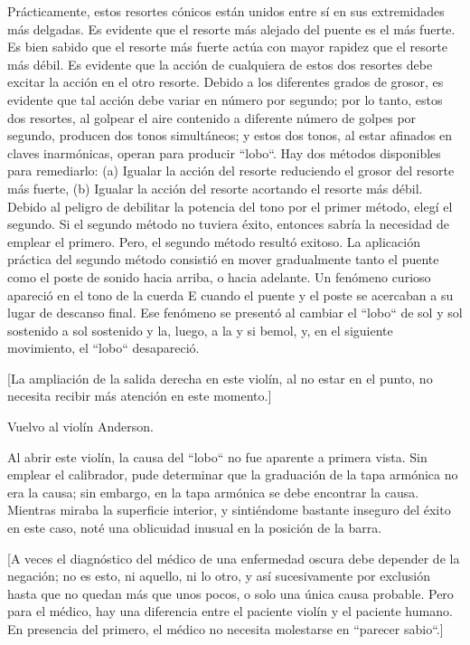 \documentclass[12pt]{book}
\begin{document}
Prácticamente, estos resortes cónicos están unidos entre sí en sus extremidades más delgadas. Es evidente que el resorte más alejado del puente es el más fuerte. Es bien sabido que el resorte más fuerte actúa con mayor rapidez que el resorte más débil. Es evidente que la acción de cualquiera de estos dos resortes debe excitar la acción en el otro resorte. Debido a los diferentes grados de grosor, es evidente que tal acción debe variar en número por segundo; por lo tanto, estos dos resortes, al golpear el aire contenido a diferente número de golpes por segundo, producen dos tonos simultáneos; y estos dos tonos, al estar afinados en claves inarmónicas, operan para producir ``lobo``. Hay dos métodos disponibles para remediarlo: (a) Igualar la acción del resorte reduciendo el grosor del resorte más fuerte, (b) Igualar la acción del resorte acortando el resorte más débil. Debido al peligro de debilitar la potencia del tono por el primer método, elegí el segundo. Si el segundo método no tuviera éxito, entonces sabría la necesidad de emplear el primero. Pero, el segundo método resultó exitoso. La aplicación práctica del segundo método consistió en mover gradualmente tanto el puente como el poste de sonido hacia arriba, o hacia adelante. Un fenómeno curioso apareció en el tono de la cuerda E cuando el puente y el poste se acercaban a su lugar de descanso final. Ese fenómeno se presentó al cambiar el ``lobo`` de sol y sol sostenido a sol sostenido y la, luego, a la y si bemol, y, en el siguiente movimiento, el ``lobo`` desapareció.

[La ampliación de la salida derecha en este violín, al no estar en el punto, no necesita recibir más atención en este momento.]

Vuelvo al violín Anderson.

Al abrir este violín, la causa del ``lobo`` no fue aparente a primera vista. Sin emplear el calibrador, pude determinar que la graduación de la tapa armónica no era la causa; sin embargo, en la tapa armónica se debe encontrar la causa. Mientras miraba la superficie interior, y sintiéndome bastante inseguro del éxito en este caso, noté una oblicuidad inusual en la posición de la barra.

[A veces el diagnóstico del médico de una enfermedad oscura debe depender de la negación; no es esto, ni aquello, ni lo otro, y así sucesivamente por exclusión hasta que no quedan más que unos pocos, o solo una única causa probable. Pero para el médico, hay una diferencia entre el paciente violín y el paciente humano. En presencia del primero, el médico no necesita molestarse en ``parecer sabio``.]
\end{document}
